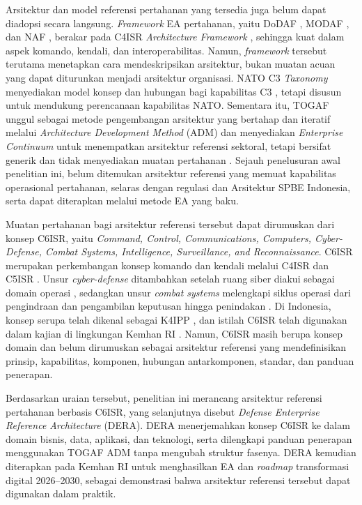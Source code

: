 Arsitektur dan model referensi pertahanan yang tersedia juga belum dapat diadopsi secara langsung. \textit{Framework} EA pertahanan, yaitu DoDAF\label{sk:DoDAF} \cite{DoDAF2010v202}, MODAF\label{sk:MODAF} \cite{Weilkiens2022}, dan NAF\label{sk:NAF} \cite{NAFv41}, berakar pada C4ISR\label{sk:C4ISR} \textit{Architecture Framework} \cite{C4ISRAWG1998}, sehingga kuat dalam aspek komando, kendali, dan interoperabilitas. Namun, \textit{framework} tersebut terutama menetapkan cara mendeskripsikan arsitektur, bukan muatan acuan yang dapat diturunkan menjadi arsitektur organisasi. NATO\label{sk:NATO} C3 \textit{Taxonomy} menyediakan model konsep dan hubungan bagi kapabilitas C3 \cite{NATOC3Taxonomy}, tetapi disusun untuk mendukung perencanaan kapabilitas NATO. Sementara itu, TOGAF\label{sk:TOGAF} unggul sebagai metode pengembangan arsitektur yang bertahap dan iteratif melalui \textit{Architecture Development Method} (ADM\label{sk:ADM}) dan menyediakan \textit{Enterprise Continuum} untuk menempatkan arsitektur referensi sektoral, tetapi bersifat generik dan tidak menyediakan muatan pertahanan \cite{TOGAF2022}. Sejauh penelusuran awal penelitian ini, belum ditemukan arsitektur referensi yang memuat kapabilitas operasional pertahanan, selaras dengan regulasi dan Arsitektur SPBE Indonesia, serta dapat diterapkan melalui metode EA yang baku.

Muatan pertahanan bagi arsitektur referensi tersebut dapat dirumuskan dari konsep C6ISR\label{sk:C6ISR}, yaitu \textit{Command, Control, Communications, Computers, Cyber-Defense, Combat Systems, Intelligence, Surveillance, and Reconnaissance}. C6ISR merupakan perkembangan konsep komando dan kendali melalui C4ISR dan C5ISR\label{sk:C5ISR} \cite{Petrovski2023,Todorovic2025}. Unsur \textit{cyber-defense} ditambahkan setelah ruang siber diakui sebagai domain operasi \cite{NATO2016Warsaw}, sedangkan unsur \textit{combat systems} melengkapi siklus operasi dari pengindraan dan pengambilan keputusan hingga penindakan \cite{Petrovski2023}. Di Indonesia, konsep serupa telah dikenal sebagai K4IPP\label{sk:K4IPP} \cite{Permenhan8Tahun2016}, dan istilah C6ISR telah digunakan dalam kajian di lingkungan Kemhan RI \cite{Dwipratama2023}. Namun, C6ISR masih berupa konsep domain dan belum dirumuskan sebagai arsitektur referensi yang mendefinisikan prinsip, kapabilitas, komponen, hubungan antarkomponen, standar, dan panduan penerapan.

Berdasarkan uraian tersebut, penelitian ini merancang arsitektur referensi pertahanan berbasis C6ISR, yang selanjutnya disebut \textit{Defense Enterprise Reference Architecture} (DERA\label{sk:DERA}). DERA menerjemahkan konsep C6ISR ke dalam domain bisnis, data, aplikasi, dan teknologi, serta dilengkapi panduan penerapan menggunakan TOGAF ADM tanpa mengubah struktur fasenya. DERA kemudian diterapkan pada Kemhan RI untuk menghasilkan EA dan \textit{roadmap} transformasi digital 2026–2030, sebagai demonstrasi bahwa arsitektur referensi tersebut dapat digunakan dalam praktik.

